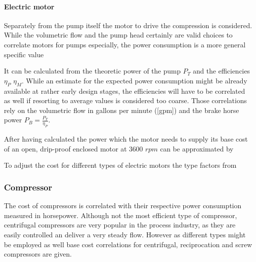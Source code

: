 			
		\paragraph{Electric motor}
			Separately from the pump itself the motor to drive the compression is considered. While the
			volumetric flow and the pump head certainly are valid choices to correlate motors for pumps
			especially, the power consumption is a more general specific value
			
			It can be calculated from the theoretic power of the pump $P_T$ and the efficiencies $\eta_P$
			$\eta_M$. While an estimate for the expected power consumption might be already available at
			rather early design stages, the efficiencies will have to be correlated as well if resorting
			to average values is considered too coarse. Those correlations rely on the volumetric flow in
			gallons per minute ([gpm]) and the brake horse power $P_B = \frac{P_T}{\eta_P}$.
			
			
			After having calculated the power which the motor needs to supply its base cost of an open,
			drip-proof enclosed motor at 3600 $rpm$ can be approximated by
			
			To adjust the cost for different types of electric motors the type factors from 
			
	
	\subsubsection{Compressor}
		The cost of compressors is correlated with their respective power consumption measured in horsepower.
		Although not the most efficient type of compressor, centrifugal compressors are very popular in the
		process industry, as they are easily controlled an deliver a very steady flow. However as different
		types might be employed as well base cost correlations for centrifugal, reciprocation and screw
		compressors are given.
		

